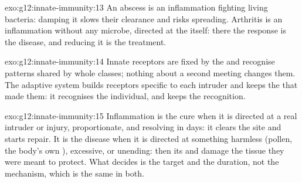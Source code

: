 \begin{solution}{exo:g12:innate-immunity:13}
An abscess is an inflammation fighting living bacteria: damping it
slows their clearance and risks spreading. Arthritis is an
inflammation without any microbe, directed at the  itself: there
the response is the disease, and reducing it is the treatment.
\end{solution}

\begin{solution}{exo:g12:innate-immunity:14}
Innate receptors are fixed by the  and recognise patterns shared
by whole classes; nothing about a second meeting changes them. The
adaptive system builds receptors specific to each intruder and keeps
the  that made them: it recognises the individual, and keeps the
recognition.
\end{solution}

\begin{solution}{exo:g12:innate-immunity:15}
Inflammation is the cure when it is directed at a real intruder or
injury, proportionate, and resolving in days: it clears the site and
starts repair. It is the disease when it is directed at something
harmless (pollen, the body's own ), excessive, or unending:
then its  and  damage the tissue they were meant to
protect. What decides is the target and the duration, not the
mechanism, which is the same in both.
\end{solution}

